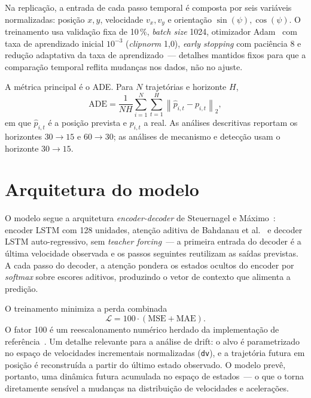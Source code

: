 \documentclass[runningheads]{llncs}
\begin{document}
Na replica\c{c}\~ao, a entrada de cada passo temporal \'e composta por seis vari\'aveis normalizadas: posi\c{c}\~ao \(x,y\), velocidade \(v_x,v_y\) e orienta\c{c}\~ao \(\sin(\psi), \cos(\psi)\). O treinamento usa valida\c{c}\~ao fixa de 10\,\%, \textit{batch size} 1024, otimizador Adam~\cite{adam} com taxa de aprendizado inicial $10^{-3}$ (\textit{clipnorm} 1{,}0), \textit{early stopping} com paci\^encia 8 e redu\c{c}\~ao adaptativa da taxa de aprendizado~--- detalhes mantidos fixos para que a compara\c{c}\~ao temporal reflita mudan\c{c}as nos dados, n\~ao no ajuste.

A m\'etrica principal \'e o ADE. Para \(N\) trajet\'orias e horizonte \(H\),
\begin{equation}\label{eq:ade}
\mathrm{ADE} = \frac{1}{NH} \sum_{i=1}^{N}\sum_{t=1}^{H} \left\lVert \hat{p}_{i,t} - p_{i,t} \right\rVert_2,
\end{equation}
em que \(\hat{p}_{i,t}\) \'e a posi\c{c}\~ao prevista e \(p_{i,t}\) a real. As an\'alises descritivas reportam os horizontes \(30 \rightarrow 15\) e \(60 \rightarrow 30\); as an\'alises de mecanismo e detec\c{c}\~ao usam o horizonte \(30 \rightarrow 15\).

\section{Arquitetura do modelo}
\label{sec:arquitetura}

O modelo segue a arquitetura \textit{encoder-decoder} de Steuernagel e M\'aximo~\cite{seq2seq}: encoder LSTM com 128 unidades, aten\c{c}\~ao aditiva de Bahdanau et al.~\cite{bahdanau} e decoder LSTM auto-regressivo, sem \textit{teacher forcing}~--- a primeira entrada do decoder \'e a \'ultima velocidade observada e os passos seguintes reutilizam as sa\'idas previstas. A cada passo do decoder, a aten\c{c}\~ao pondera os estados ocultos do encoder por \textit{softmax} sobre escores aditivos, produzindo o vetor de contexto que alimenta a predi\c{c}\~ao.

O treinamento minimiza a perda combinada
\begin{equation}\label{eq:loss}
\mathcal{L} = 100 \cdot (\mathrm{MSE} + \mathrm{MAE}).
\end{equation}
O fator 100 \'e um reescalonamento num\'erico herdado da implementa\c{c}\~ao de refer\^encia~\cite{seq2seq}. Um detalhe relevante para a an\'alise de drift: o alvo \'e parametrizado no espa\c{c}o de velocidades incrementais normalizadas (\texttt{dv}), e a trajet\'oria futura em posi\c{c}\~ao \'e reconstru\'ida a partir do \'ultimo estado observado. O modelo prev\^e, portanto, uma din\^amica futura acumulada no espa\c{c}o de estados~--- o que o torna diretamente sens\'ivel a mudan\c{c}as na distribui\c{c}\~ao de velocidades e acelera\c{c}\~oes.
\end{document}
